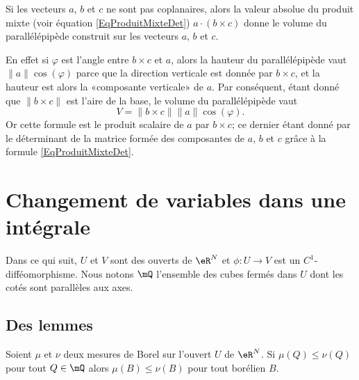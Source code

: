 Si les vecteurs $a$, $b$ et $c$ ne sont pas coplanaires, alors la valeur absolue du produit mixte (voir équation \eqref{EqProduitMixteDet}) $a\cdot(b\times c)$ donne le volume du parallélépipède construit sur les vecteurs $a$, $b$ et $c$.

En effet si $\varphi$ est l'angle entre $b\times c$ et $a$, alors la hauteur du parallélépipède vaut $\| a \|\cos(\varphi)$ parce que la direction verticale est donnée par $b\times c$, et la hauteur est alors la «composante verticale» de $a$. Par conséquent, étant donné que $\| b\times c \|$ est l'aire de la base, le volume du parallélépipède vaut
\begin{equation}
    V=\| b\times c\|  \| a \|\cos(\varphi).
\end{equation}
Or cette formule est le produit scalaire de $a$ par $b \times c$; ce dernier étant donné par le déterminant de la matrice formée des composantes de $a$, $b$ et $c$ grâce à la formule \eqref{EqProduitMixteDet}.

\section{Changement de variables dans une intégrale}

Dans ce qui suit, \( U\) et \( V\) sont des ouverts de \( \eR^N\) et \( \phi\colon U\to V\) est un \( C^1\)-difféomorphisme. Nous notons \( \mQ\) l'ensemble des cubes fermés dans \( U\) dont les cotés sont parallèles aux axes.

\subsection{Des lemmes}

\begin{lemma}
    Soient \( \mu\) et \( \nu\) deux mesures de Borel sur l'ouvert \( U\) de \( \eR^N\). Si \( \mu(Q)\leq \nu(Q)\) pour tout \( Q\in \mQ\) alors \( \mu(B)\leq \nu(B)\) pour tout borélien \( B\).
\end{lemma}

